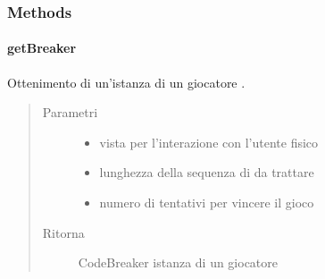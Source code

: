 \documentclass[letterpaper,10pt,italian,openany,oneside]{sphinxmanual}
\begin{document}
\subsubsection{Methods}
\label{\detokenize{source/it/unicam/cs/pa/mastermind/factories/BreakerFactory:methods}}

\paragraph{getBreaker}
\label{\detokenize{source/it/unicam/cs/pa/mastermind/factories/BreakerFactory:getbreaker}}

\begin{fulllineitems}
\label{\detokenize{source/it/unicam/cs/pa/mastermind/factories/BreakerFactory:it.unicam.cs.pa.mastermind.factories.BreakerFactory.getBreaker(GameView, int, int)}}
Ottenimento di un’istanza di un giocatore .
\begin{quote}\begin{description}
\item[{Parametri}] \leavevmode\begin{itemize}
\item {} 
 \textendash{} vista per l’interazione con l’utente fisico

\item {} 
 \textendash{} lunghezza della sequenza di  da trattare

\item {} 
 \textendash{} numero di tentativi per vincere il gioco

\end{itemize}

\item[{Ritorna}] \leavevmode
CodeBreaker istanza di un giocatore 

\end{description}\end{quote}

\end{fulllineitems}
\end{document}
